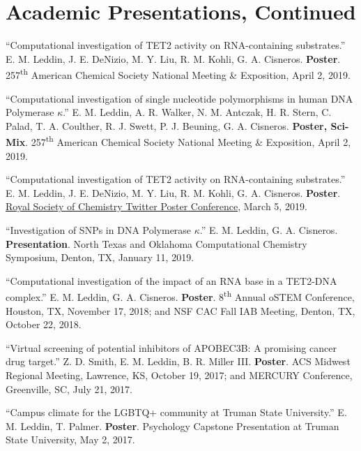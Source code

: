 \documentclass[letterpaper,11pt]{article}
\begin{document}
\section{Academic Presentations, Continued}
\begin{etaremune}[start=10]
\small{
  \item \textnormal{``Computational investigation of TET2 activity on RNA-containing substrates.'' E. M. Leddin, J. E. DeNizio, M. Y. Liu, R. M. Kohli, G. A. Cisneros. \textbf{Poster}. 257\textsuperscript{th} American Chemical Society National Meeting \& Exposition, April 2, 2019.}
  \item \textnormal{``Computational investigation of single nucleotide polymorphisms in human DNA Polymerase $\kappa$.'' E. M. Leddin, A. R. Walker, N. M. Antczak, H. R. Stern, C. Palad, T. A. Coulther, R. J. Swett, P. J. Beuning, G. A. Cisneros. \textbf{Poster, Sci-Mix}. 257\textsuperscript{th} American Chemical Society National Meeting \& Exposition, April 2, 2019.}
  \item \textnormal{``Computational investigation of TET2 activity on RNA-containing substrates.'' E. M. Leddin, J. E. DeNizio, M. Y. Liu, R. M. Kohli, G. A. Cisneros. \textbf{Poster}. \href{https://twitter.com/EmLedd1/status/1103107933951459333?s=20}{Royal Society of Chemistry Twitter Poster Conference}, March 5, 2019.}
  \item \textnormal{``Investigation of SNPs in DNA Polymerase $\kappa$.'' E. M. Leddin, G. A. Cisneros. \textbf{Presentation}. North Texas and Oklahoma Computational Chemistry Symposium, Denton, TX, January 11, 2019.}
  \item \textnormal{``Computational investigation of the impact of an RNA base in a TET2-DNA complex.'' E. M. Leddin, G. A. Cisneros. \textbf{Poster}. 8\textsuperscript{th} Annual oSTEM Conference, Houston, TX, November 17, 2018; and NSF CAC Fall IAB Meeting, Denton, TX, October 22, 2018.}
  \item \textnormal{``Virtual screening of potential inhibitors of APOBEC3B: A promising cancer drug target.'' Z. D. Smith, E. M. Leddin, B. R. Miller III. \textbf{Poster}. ACS Midwest Regional Meeting, Lawrence, KS, October 19, 2017; and MERCURY Conference, Greenville, SC, July 21, 2017.}
  \item \textnormal{``Campus climate for the LGBTQ+ community at Truman State University.'' E. M. Leddin, T. Palmer. \textbf{Poster}. Psychology Capstone Presentation at Truman State University, May 2, 2017.}
}
\end{etaremune}
\end{document}
